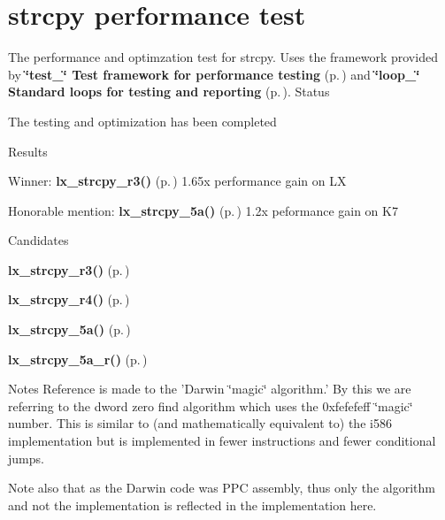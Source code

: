 \section{strcpy performance test}
\label{group__strcpy__test}
The performance and optimzation test for strcpy. Uses the framework provided by {\bf \char`\"{}test\_\-\char`\"{} Test framework for performance testing} {\rm (p.\,\pageref{group__test})} and {\bf \char`\"{}loop\_\-\char`\"{} Standard loops for testing and reporting} {\rm (p.\,\pageref{group__loop__test})}. 
Status

The testing and optimization has been completed

Results

\begin{CompactItemize}
\item 
Winner: {\bf lx\_\-strcpy\_\-r3()} {\rm (p.\,\pageref{strcpy_2def__test_8h_a3})} 1.65x performance gain on LX \item 
Honorable mention: {\bf lx\_\-strcpy\_\-5a()} {\rm (p.\,\pageref{strcpy_2def__test_8h_a1})} 1.2x peformance gain on K7\end{CompactItemize}
Candidates \begin{CompactItemize}
\item 
{\bf lx\_\-strcpy\_\-r3()} {\rm (p.\,\pageref{strcpy_2def__test_8h_a3})}\item 
{\bf lx\_\-strcpy\_\-r4()} {\rm (p.\,\pageref{strcpy_2def__test_8h_a4})}\item 
{\bf lx\_\-strcpy\_\-5a()} {\rm (p.\,\pageref{strcpy_2def__test_8h_a1})}\item 
{\bf lx\_\-strcpy\_\-5a\_\-r()} {\rm (p.\,\pageref{strcpy_2def__test_8h_a2})}\end{CompactItemize}
Notes Reference is made to the 'Darwin \char`\"{}magic\char`\"{} algorithm.' By this we are referring to the dword zero find algorithm which uses the 0xfefefeff \char`\"{}magic\char`\"{} number. This is similar to (and mathematically equivalent to) the i586 implementation but is implemented in fewer instructions and fewer conditional jumps.

Note also that as the Darwin code was PPC assembly, thus only the algorithm and not the implementation is reflected in the implementation here. 
